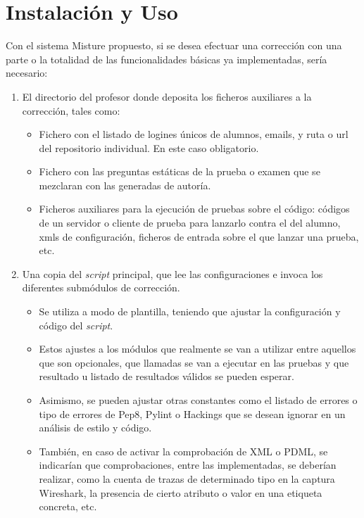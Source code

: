\cleardoublepage
\appendix
\chapter{Instalación y Uso}
\label{app:instalacion}


Con el sistema Misture propuesto, si se desea efectuar una corrección con una parte o la totalidad de las funcionalidades básicas ya implementadas, sería necesario:

\begin{enumerate}
\item El directorio del profesor donde deposita los ficheros auxiliares a la corrección, tales como:

\begin{itemize}
\item Fichero con el listado de logines únicos de alumnos, emails, y ruta o url del repositorio individual. En este caso obligatorio.

\item Fichero con las preguntas estáticas de la prueba o examen que se mezclaran con las generadas de autoría.

\item Ficheros auxiliares para la ejecución de pruebas sobre el código: códigos de un servidor o cliente de prueba para lanzarlo contra el del alumno, xmls de configuración, ficheros de entrada sobre el que lanzar una prueba, etc.
\end{itemize}


\item Una copia del \textit{script} principal, que lee las configuraciones e invoca los diferentes submódulos de corrección.

\begin{itemize}
\item Se utiliza a modo de plantilla, teniendo que ajustar la configuración y código del \textit{script}.

\item Estos ajustes a los módulos que realmente se van a utilizar entre aquellos que son opcionales, que llamadas se van a ejecutar en las pruebas y que resultado u listado de resultados válidos se pueden esperar.

\item Asimismo, se pueden ajustar otras constantes como el listado de errores o tipo de errores de Pep8, Pylint o Hackings que se desean ignorar en un análisis de estilo y código.

\item También, en caso de activar la comprobación de XML o PDML, se indicarían que comprobaciones, entre las implementadas, se deberían realizar, como la cuenta de trazas de determinado tipo en la captura Wireshark, la presencia de cierto atributo o valor en una etiqueta concreta, etc.
\end{itemize}
\end{enumerate}

